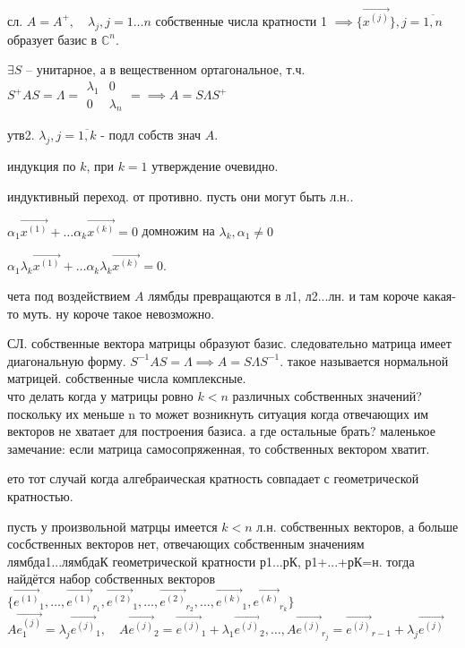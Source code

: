 \documentclass[12pt, a4paper]{article}
\begin{document}
сл. $A = A^+, \quad \lambda_j, j = 1\dotsc n$ собственные числа кратности 1 $\implies \{ \vec{x^{(j)}}\}, j=\overline{1,n}$ образует базис в $\mathbb{C}^n$.

$\exists S $ -- унитарное, а в вещественном ортагональное, т.ч. $S^+AS = \Lambda = \begin{matrix}
\lambda_1 & 0 \\ 0 & \lambda_n
\end{matrix} =\implies A = S\Lambda S^+
$

утв2. $\lambda_j, j=\overline{1, k}$ - подл собств знач $A$. 

индукция по $k$, при $k=1$ утверждение очевидно. 

индуктивный переход. от противно. пусть они могут быть л.н.. 

$\alpha_1 \vec{x^{(1)}} + \dotsc \alpha_k \vec{x^{(k)}} = 0$ домножим на $\lambda_k, \alpha_1 \neq 0$

$\alpha_1 \lambda_k \vec{x^{(1)}} + \dotsc \alpha_k \lambda_k \vec{x^{(k)}} = 0$. 

чета под воздействием $A$ лямбды превращаются в л1, л2...лн. и там короче какая-то муть. ну короче такое невозможно.

СЛ. собственные вектора матрицы образуют базис. следовательно матрица имеет диагональную форму. $S^{-1}AS = \Lambda \implies A = S\Lambda S^{-1}$. такое называется нормальной матрицей. собственные числа комплексные.\\

что делать когда у матрицы ровно $k<n$ различных собственных значений? поскольку их меньше n то может возникнуть ситуация когда отвечающих им векторов не хватает для построения базиса. а где остальные брать? маленькое замечание: если матрица самосопряженная, то собственных вектором хватит.

ето тот случай когда алгебраическая кратность совпадает с геометрической кратностью. 

пусть у произвольной матрцы имеется $k< n$ л.н. собственных векторов, а больше сосбственных векторов нет, отвечающих собственным значениям лямбда1...лямбдаК геометрической кратности р1...рК, р1+...+рК=н. тогда найдётся набор собственных векторов $\{ \vec{e^{(1)}}_1, \dotsc, \vec{e^{(1)}}_{r_1}, \vec{e^{(2)}}_1, \dotsc, \vec{e^{(2)}}_{r_2}, \dotsc, \vec{e^{(k)}}_1, \vec{e^{(k)}}_{r_k} \}$\\

$A \vec{e_1^{(j)}} = \lambda_j \vec{e^{(j)}}_1, \quad A \vec{e^{(j)}}_2 = \vec{e^{(j)}}_1 + \lambda_1 \vec{e^{(j)}}_2, \dotsc, A \vec{e^{(j)}}_{r_j} = \vec{e^{(j)}}_{r-1} + \lambda_j \vec{e^{(j)}}$\\
\end{document}
